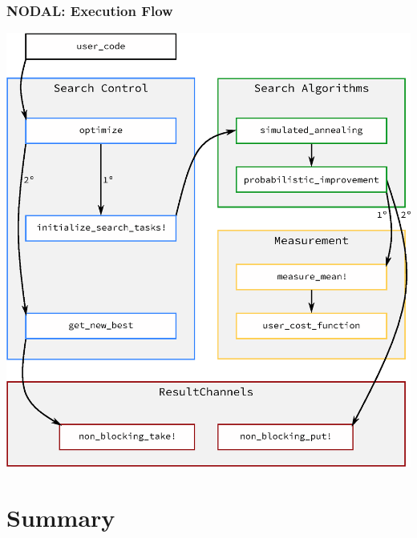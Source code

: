 \documentclass[10pt, compress, aspectratio=169]{beamer}
\begin{document}
\begin{frame}
    \frametitle{NODAL: Execution Flow}
    \begin{center}
        \includegraphics[height=.9\textheight]{nodal_callgraph}
    \end{center}
\end{frame}

\section*{Summary}
\end{document}
